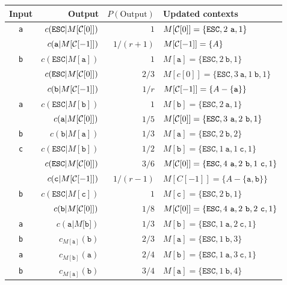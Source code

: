 \documentclass{article}
\begin{document}
\thispagestyle{empty}
\begin{tabular}{crrl}
  Input & Output & $P(\text{Output})$ & Updated contexts\\
  \hline
  {\tt a} & $c(\mathtt{ESC}|M[{\cal C}[0]])$ & $1$ & $M[{\cal C}[0]]=\{\mathtt{ESC},2~\mathtt{a},1\}$\\
  ~ & $c(\mathtt{a}|M[{\cal C}[-1]])$ & $1/(r+1)$ & $M[{\cal C}[-1]]=\{A\}$\\
  {\tt b} & $c(\mathtt{ESC}|M[\texttt{a}])$ & $1$ & $M[\mathtt{a}]=\{\mathtt{ESC},2~\mathtt{b},1\}$\\
  ~ & $c(\mathtt{ESC}|M[{\cal C}[0]])$ & $2/3$ & $M[c[0]]=\{\mathtt{ESC},3~\mathtt{a},1~\mathtt{b},1\}$\\
  ~ & $c(\mathtt{b}|M[{\cal C}[-1]])$ & $1/r$ & $M[{\cal C}[-1]]=\{A-\{\mathtt{a}\}\}$ \\
  {\tt a} & $c(\mathtt{ESC}|M[\texttt{b}])$ & $1$ & $M[\mathtt{b}]=\{\mathtt{ESC},2~\mathtt{a},1\}$\\
 ~ & $c(\mathtt a|M[{\cal C}[0]])$ & $1/5$ & $M[{\cal C}[0]]=\{\mathtt{ESC},3~\mathtt{a},2~\mathtt{b},1\}$\\
  {\tt b} & $c(\mathtt b|M[\mathtt{a}])$ & $1/3$ & $M[\mathtt{a}]=\{\mathtt{ESC},2~\mathtt{b},2\}$\\
  {\tt c} & $c(\mathtt{ESC}|M[\mathtt{b}])$ & $1/2$ & $M[\mathtt{b}]=\{\mathtt{ESC},1~\mathtt{a},1~\mathtt{c},1\}$\\
  ~ & $c(\mathtt{ESC}|M[{\cal C}[0]])$ & $3/6$ & $M[{\cal C}[0]]=\{\mathtt{ESC},4~\mathtt{a},2~\mathtt{b},1~\mathtt{c},1\}$\\
  ~ & $c(\mathtt c|M[{\cal C}[-1]])$ & $1/(r-1)$ & $M[C[-1]]=\{A-\{\mathtt{a},\mathtt{b}\}\}$\\
  {\tt b} & $c(\mathtt{ESC}|M[\texttt{c}])$ & $1$ & $M[\mathtt{c}]=\{\mathtt{ESC},2~\mathtt{b},1\}$\\
  ~ & $c(\mathtt b|M[{\cal C}[0]])$ & $1/8$ & $M[{\cal C}[0]]=\{\mathtt{ESC},4~\mathtt{a},2~\mathtt{b},2~\mathtt{c},1\}$\\
  {\tt a} & $c(\mathtt a|M[\mathtt{b]})$ & $1/3$ & $M[\mathtt{b}]=\{\mathtt{ESC},1~\mathtt{a},2~\mathtt{c},1\}$\\
  {\tt b} & $c_{M[\mathtt{a}]}(\mathtt b)$ & $2/3$ & $M[\mathtt{a}]=\{\mathtt{ESC},1~\mathtt{b},3\}$\\
    {\tt a} & $c_{M[\mathtt{b}]}(\mathtt a)$ & $2/4$ & $M[\mathtt{b}]=\{\mathtt{ESC},1~\mathtt{a},3~\mathtt{c},1\}$\\
    {\tt b} & $c_{M[\mathtt{a}]}(\mathtt b)$ & $3/4$ & $M[\mathtt{a}]=\{\mathtt{ESC},1~\mathtt{b},4\}$\\

\end{tabular}
\end{document}
